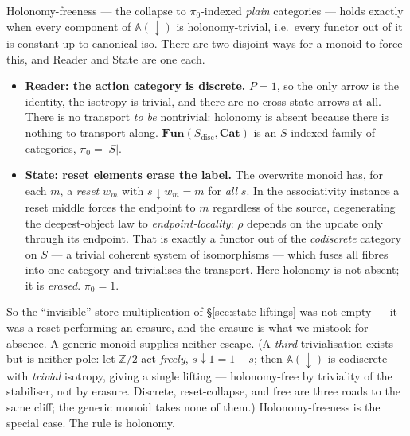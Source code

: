 \documentclass[11pt,a4paper]{book}
\newcommand{\Cat}{\mathbf{Cat}}
\theoremstyle{plain}
\theoremstyle{definition}
\theoremstyle{remark}
\begin{document}
\begin{teachbox}
Holonomy-freeness --- the collapse to $\pi_{0}$-indexed \emph{plain} categories --- holds exactly when
every component of $\mathbb A(\downarrow)$ is holonomy-trivial, i.e.\ every functor out of it is constant
up to canonical iso. There are two disjoint ways for a monoid to force this, and Reader and State are one
each.
\begin{itemize}[nosep,leftmargin=1.4em]
  \item \textbf{Reader: the action category is discrete.} $P=1$, so the only arrow is the identity, the
        isotropy is trivial, and there are no cross-state arrows at all. There is no transport
        \emph{to be} nontrivial: holonomy is absent because there is nothing to transport along.
        $\mathbf{Fun}(S_{\mathrm{disc}},\Cat)$ is an $S$-indexed family of categories, $\pi_{0}=|S|$.
  \item \textbf{State: reset elements erase the label.} The overwrite monoid has, for each $m$, a
        \emph{reset} $w_{m}$ with $s{\downarrow}w_{m}=m$ for \emph{all} $s$. In the associativity
        instance a reset middle forces the endpoint to $m$ regardless of the source, degenerating the
        deepest-object law to \emph{endpoint-locality}: $\rho$ depends on the update only through its
        endpoint. That is exactly a functor out of the \emph{codiscrete} category on $S$ --- a trivial
        coherent system of isomorphisms --- which fuses all fibres into one category and trivialises the
        transport. Here holonomy is not absent; it is \emph{erased}. $\pi_{0}=1$.
\end{itemize}
So the ``invisible'' store multiplication of \S\ref{sec:state-liftings} was not empty --- it was a reset
performing an erasure, and the erasure is what we mistook for absence. A generic monoid supplies neither
escape. (A \emph{third} trivialisation exists but is neither pole: let $\mathbb Z/2$ act \emph{freely},
$s{\downarrow}1=1-s$; then $\mathbb A(\downarrow)$ is codiscrete with \emph{trivial} isotropy, giving a
single lifting --- holonomy-free by triviality of the stabiliser, not by erasure. Discrete, reset-collapse,
and free are three roads to the same cliff; the generic monoid takes none of them.) Holonomy-freeness is
the special case. The rule is holonomy.
\end{teachbox}
\end{document}
